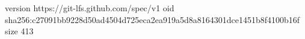 version https://git-lfs.github.com/spec/v1
oid sha256:c27091bb9228d50ad4504d725eca2ea919a5d8a8164301dce1451b8f4100b16f
size 413
